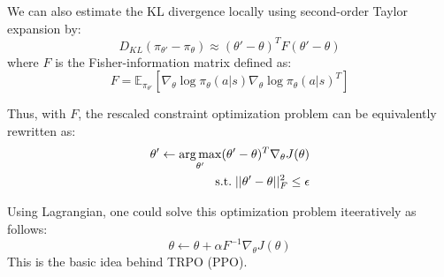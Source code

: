 We can also estimate the KL divergence locally using second-order Taylor expansion by:
\[
D_{KL}(\pi_{\theta'}-\pi_\theta)\approx(\theta'-\theta)^TF(\theta'-\theta)
\]
where $F$ is the Fisher-information matrix defined as:
\[
F = \mathbb{E}_{\pi_{\theta'}}[\nabla_\theta\log\pi_\theta(a|s)\nabla_\theta\log\pi_\theta(a|s)^T]
\]

Thus, with $F$, the rescaled constraint optimization problem can be equivalently rewritten as:
\begin{equation}
\begin{aligned}
\theta'\leftarrow \operatorname*{arg\,max}_{\theta'}(\theta'-\theta)^T \nabla_{\theta}J(\theta)\\
\mathrm{s.t. }\;||\theta'-\theta||^2_F\leq\epsilon
    \end{aligned}
\end{equation}

Using Lagrangian, one could solve this optimization problem iteeratively as follows:
\[\theta \leftarrow \theta + \alpha F^{-1}\nabla_\theta J(\theta)
\]
This is the basic idea behind TRPO (PPO).